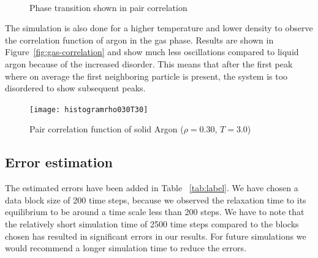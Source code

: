 \documentclass[
10pt, %
a4paper, %
oneside, %
headinclude,footinclude, %
BCOR5mm, %
]{scrartcl}
\begin{document}
\begin{figure}[tb]
\centering
{} \quad
{} \\
 \quad
{}
\caption[Pair correlation function of Argon($\rho = 0.88$, $T=0.4-1.0$) ]{Phase transition shown in pair correlation} %
\label{fig:correlation}
\end{figure}


The simulation is also done for a higher temperature and lower density to observe the correlation function of argon in the gas phase. Results are shown in Figure~\vref{fig:gas-correlation} and show much less oscillations compared to liquid argon because of the increased disorder. This means that after the first peak where on average the first neighboring particle is present, the system is too disordered to show subsequent peaks.


\begin{figure}[tb]
\centering 
\texttt{[image: histogramrho030T30]} 
\caption[Pair correlation function of Argon($\rho = 0.30$, $T=3.0$) ]{Pair correlation function of solid Argon ($\rho = 0.30$, $T=3.0$)} %
\label{fig:gas-correlation} 
\end{figure}

\subsection{Error estimation}
The estimated errors have been added in Table ~\vref{tab:label}. We have chosen a data block size of 200 time steps, because we observed the relaxation time to its equilibrium to be around a time scale less than 200 steps. We have to note that the relatively short simulation time of 2500 time steps compared to the blocks chosen has resulted in significant errors in our results. For future simulations we would recommend a longer simulation time to reduce the errors.
\end{document}
